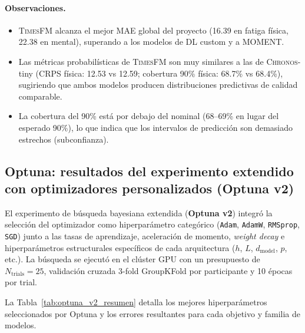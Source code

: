 \documentclass[12pt, a4paper]{article}
\newcommand{\code}[1]{\texttt{#1}}
\newcommand{\chronos}{\textsc{Chronos}}
\newcommand{\timesfm}{\textsc{TimesFM}}
\begin{document}
\paragraph{Observaciones.}
\begin{itemize}
    \item \timesfm{} alcanza el mejor MAE global del proyecto (16.39 en fatiga física, 22.38 en mental), superando a los modelos de DL custom y a MOMENT.
    \item Las métricas probabilísticas de \timesfm{} son muy similares a las de \chronos{}-tiny (CRPS física: 12.53 vs 12.59; cobertura 90\% física: 68.7\% vs 68.4\%), sugiriendo que ambos modelos producen distribuciones predictivas de calidad comparable.
    \item La cobertura del 90\% está por debajo del nominal (68--69\% en lugar del esperado 90\%), lo que indica que los intervalos de predicción son demasiado estrechos (subconfianza).
\end{itemize}


\subsection{Optuna: resultados del experimento extendido con optimizadores personalizados (Optuna v2)}
\label{sec:optuna_v2_resultados}

El experimento de búsqueda bayesiana extendida (\textbf{Optuna v2}) integró la selección del optimizador como hiperparámetro categórico (\code{Adam}, \code{AdamW}, \code{RMSprop}, \code{SGD}) junto a las tasas de aprendizaje, aceleración de momento, \textit{weight decay} e hiperparámetros estructurales específicos de cada arquitectura ($h$, $L$, $d_{\text{model}}$, $p$, etc.). La búsqueda se ejecutó en el clúster GPU con un presupuesto de $N_{\text{trials}} = 25$, validación cruzada 3-fold GroupKFold por participante y 10 épocas por trial.

La Tabla~\ref{tab:optuna_v2_resumen} detalla los mejores hiperparámetros seleccionados por Optuna y los errores resultantes para cada objetivo y familia de modelos.
\end{document}
